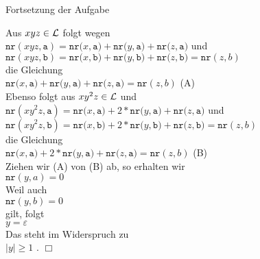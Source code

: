 \begin{slide}{}
\normalsize

\begin{center}
Fortsetzung der Aufgabe
\end{center}
\vspace*{0.5cm}

\footnotesize
Aus $xyz \in {\cal L}$ folgt wegen \\[0.3cm]
\hspace*{1.3cm} $\mathtt{nr}(xyz, \mathtt{a}) = \mathtt{nr}(x,\mathtt{a)} + \mathtt{nr}(y,\mathtt{a)} + \mathtt{nr}(z,\mathtt{a)}$  und \\[0.3cm]
\hspace*{1.3cm}
 $\mathtt{nr}(xyz, \mathtt{b}) = \mathtt{nr}(x,\mathtt{b)} + \mathtt{nr}(y,\mathtt{b)} + \mathtt{nr}(z,\mathtt{b)} = \mathtt{nr}(z,b)$ \\[0.3cm]
die Gleichung \\[0.3cm]
\hspace*{1.3cm}  $\mathtt{nr}(x,\mathtt{a)} + \mathtt{nr}(y,\mathtt{a)} + \mathtt{nr}(z,\mathtt{a)} =  \mathtt{nr}(z,b)$ \hspace*{\fill} (A) \\[0.3cm]
Ebenso folgt aus $xy^2z \in {\cal L}$ und \\[0.3cm]
\hspace*{1.3cm} $\mathtt{nr}(xy^2z, \mathtt{a}) = \mathtt{nr}(x,\mathtt{a)} + 2 * \mathtt{nr}(y,\mathtt{a)} + \mathtt{nr}(z,\mathtt{a)}$  und \\[0.3cm]
\hspace*{1.3cm} $\mathtt{nr}(xy^2z, \mathtt{b}) = \mathtt{nr}(x,\mathtt{b)} + 2 * \mathtt{nr}(y,\mathtt{b)} + \mathtt{nr}(z,\mathtt{b)} = \mathtt{nr}(z,b)$ \\[0.3cm]
die Gleichung \\[0.3cm]
\hspace*{1.3cm}  $\mathtt{nr}(x,\mathtt{a)} + 2 *\mathtt{nr}(y,\mathtt{a)} + \mathtt{nr}(z,\mathtt{a)} =  \mathtt{nr}(z,b)$ \hspace*{\fill} (B) \\[0.3cm]
Ziehen wir (A) von (B) ab, so erhalten wir \\[0.3cm]
\hspace*{1.3cm} $\mathtt{nr}(y,a) = 0$ \\[0.3cm]
Weil auch \\[0.3cm]
\hspace*{1.3cm} $\mathtt{nr}(y,b) = 0$ \\[0.3cm]
gilt, folgt \\[0.3cm]
\hspace*{1.3cm} $y = \varepsilon$ \\[0.3cm]
Das steht im Widerspruch zu\\[0.3cm]
\hspace*{1.3cm}  $|y| \geq 1$ . \hspace*{\fill} $\Box$


\end{slide}
